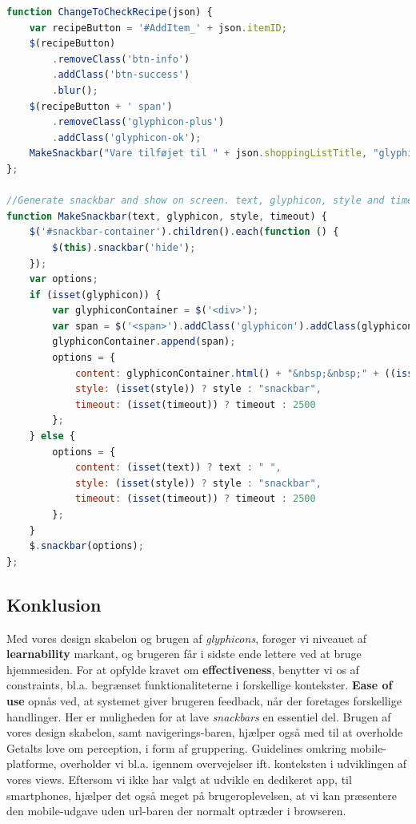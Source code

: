 \begin{lstlisting}[language=JavaScript,caption={Javascript funktioner, der giver bruger feedback},label=code:user_feedback]
function ChangeToCheckRecipe(json) {
    var recipeButton = '#AddItem_' + json.itemID;
    $(recipeButton)
        .removeClass('btn-info')
        .addClass('btn-success')
        .blur();
    $(recipeButton + ' span')
        .removeClass('glyphicon-plus')
        .addClass('glyphicon-ok');
    MakeSnackbar("Vare tilføjet til " + json.shoppingListTitle, "glyphicon-ok", "toast", "1500");
};

//Generate snackbar and show on screen. text, glyphicon, style and timeout is optional.
function MakeSnackbar(text, glyphicon, style, timeout) {
    $('#snackbar-container').children().each(function () {
        $(this).snackbar('hide');
    });
    var options;
    if (isset(glyphicon)) {
        var glyphiconContainer = $('<div>');
        var span = $('<span>').addClass('glyphicon').addClass(glyphicon);
        glyphiconContainer.append(span);
        options = {
            content: glyphiconContainer.html() + "&nbsp;&nbsp;" + ((isset(text)) ? text : " "),
            style: (isset(style)) ? style : "snackbar",
            timeout: (isset(timeout)) ? timeout : 2500
        };
    } else {
        options = {
            content: (isset(text)) ? text : " ",
            style: (isset(style)) ? style : "snackbar",
            timeout: (isset(timeout)) ? timeout : 2500
        };
    }
    $.snackbar(options);
};
\end{lstlisting}

\subsection{Konklusion}
Med vores design skabelon og brugen af \textit{glyphicons}, forøger vi niveauet af \textbf{learnability} markant, og brugeren får i sidste ende lettere ved at bruge hjemmesiden.
For at opfylde kravet om \textbf{effectiveness}, benytter vi os af constraints, bl.a. begrænset funktionaliteterne i forskellige kontekster.
\textbf{Ease of use} opnås ved, at systemet giver brugeren feedback, når der foretages forskellige handlinger.
Her er muligheden for at lave \textit{snackbars} en essentiel del.
Brugen af vores design skabelon, samt navigerings-baren, hjælper også med til at overholde Getalts love om perception, i form af gruppering.
Guidelines omkring mobile-platforme, overholder vi bl.a. igennem overvejelser ift. konteksten i udviklingen af vores views.
Eftersom vi ikke har valgt at udvikle en dedikeret app, til smartphones, hjælper det også meget på brugeroplevelsen, at vi kan præsentere den mobile-udgave uden url-baren der normalt optræder i browseren.
